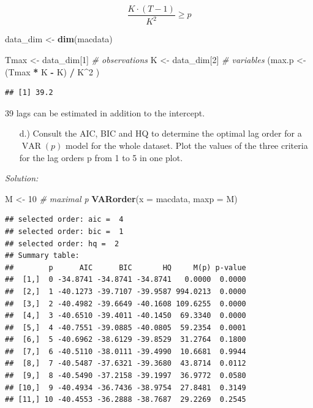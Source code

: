 \documentclass[12pt,a4paper]{article}
\newcommand{\VAR}{\operatorname{VAR}} %
\newenvironment{Shaded}{\begin{snugshade}}{\end{snugshade}}
\newcommand{\CommentTok}[1]{\textcolor[rgb]{0.56,0.35,0.01}{\textit{#1}}}
\newcommand{\DataTypeTok}[1]{\textcolor[rgb]{0.13,0.29,0.53}{#1}}
\newcommand{\DecValTok}[1]{\textcolor[rgb]{0.00,0.00,0.81}{#1}}
\newcommand{\KeywordTok}[1]{\textcolor[rgb]{0.13,0.29,0.53}{\textbf{#1}}}
\newcommand{\NormalTok}[1]{#1}
\newcommand{\OperatorTok}[1]{\textcolor[rgb]{0.81,0.36,0.00}{\textbf{#1}}}
\newcommand{\StringTok}[1]{\textcolor[rgb]{0.31,0.60,0.02}{#1}}
\begin{document}
\[ \dfrac{K \cdot (T -1)}{K^2} \geq p\]

\begin{Shaded}
\begin{Highlighting}[]
\NormalTok{data_dim <-}\StringTok{ }\KeywordTok{dim}\NormalTok{(macdata) }

\NormalTok{Tmax <-}\StringTok{ }\NormalTok{data_dim[}\DecValTok{1}\NormalTok{] }\CommentTok{# observations}
\NormalTok{K <-}\StringTok{ }\NormalTok{data_dim[}\DecValTok{2}\NormalTok{] }\CommentTok{# variables}
\NormalTok{(max.p <-}\StringTok{ }\NormalTok{(Tmax }\OperatorTok{*}\StringTok{ }\NormalTok{K }\OperatorTok{-}\StringTok{ }\NormalTok{K) }\OperatorTok{/}\StringTok{ }\NormalTok{K}\OperatorTok{^}\DecValTok{2}\NormalTok{ )}
\end{Highlighting}
\end{Shaded}

\begin{verbatim}
## [1] 39.2
\end{verbatim}

39 lags can be estimated in addition to the intercept.

\begin{itemize}
  \item[d.)] Consult the AIC, BIC and HQ to determine the optimal lag order for a $\VAR(p)$ model for the whole dataset. Plot the values of the three criteria for the lag orders p from 1 to 5 in one plot.
\end{itemize}

\emph{Solution:}

\begin{Shaded}
\begin{Highlighting}[]
\NormalTok{M <-}\StringTok{ }\DecValTok{10} \CommentTok{# maximal p }
\KeywordTok{VARorder}\NormalTok{(}\DataTypeTok{x =}\NormalTok{ macdata, }\DataTypeTok{maxp =}\NormalTok{ M)}
\end{Highlighting}
\end{Shaded}

\begin{verbatim}
## selected order: aic =  4 
## selected order: bic =  1 
## selected order: hq =  2 
## Summary table:  
##        p      AIC      BIC       HQ     M(p) p-value
##  [1,]  0 -34.8741 -34.8741 -34.8741   0.0000  0.0000
##  [2,]  1 -40.1273 -39.7107 -39.9587 994.0213  0.0000
##  [3,]  2 -40.4982 -39.6649 -40.1608 109.6255  0.0000
##  [4,]  3 -40.6510 -39.4011 -40.1450  69.3340  0.0000
##  [5,]  4 -40.7551 -39.0885 -40.0805  59.2354  0.0001
##  [6,]  5 -40.6962 -38.6129 -39.8529  31.2764  0.1800
##  [7,]  6 -40.5110 -38.0111 -39.4990  10.6681  0.9944
##  [8,]  7 -40.5487 -37.6321 -39.3680  43.8714  0.0112
##  [9,]  8 -40.5490 -37.2158 -39.1997  36.9772  0.0580
## [10,]  9 -40.4934 -36.7436 -38.9754  27.8481  0.3149
## [11,] 10 -40.4553 -36.2888 -38.7687  29.2269  0.2545
\end{verbatim}
\end{document}
